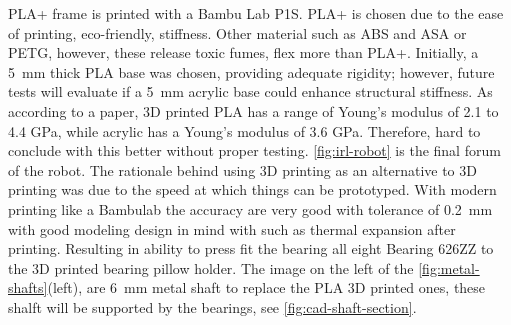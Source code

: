 PLA+ frame is printed with a Bambu Lab P1S. PLA+ is chosen due to the ease of printing, eco-friendly, stiffness. Other material such as ABS and ASA or PETG, however, these release toxic fumes, flex more than PLA+. Initially, a 5 mm thick PLA base was chosen, providing adequate rigidity; however, future tests will evaluate if a 5 mm acrylic base could enhance structural stiffness. As according to a paper, 3D printed PLA has a range of Young's modulus of 2.1 to 4.4 GPa, while acrylic has a Young's modulus of 3.6 GPa. Therefore, hard to conclude with this better without proper testing. 
\ref{fig:irl-robot} is the final forum of the robot. The rationale behind using 3D printing as an alternative to 3D printing was due to the speed at which things can be prototyped. With modern printing like a Bambulab the accuracy are very good with tolerance of 0.2 mm with good modeling design in mind with such as thermal expansion after printing. Resulting in ability to press fit the bearing all eight Bearing 626ZZ to the 3D printed bearing pillow holder. The image on the left of the \ref{fig:metal-shafts}(left), are 6 mm metal shaft to replace the PLA 3D printed ones, these shalft will be supported by the bearings, see \ref{fig:cad-shaft-section}.

